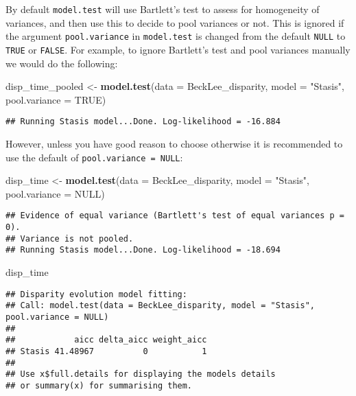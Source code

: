 \documentclass[
]{book}
\newenvironment{Shaded}{\begin{snugshade}}{\end{snugshade}}
\newcommand{\DataTypeTok}[1]{\textcolor[rgb]{0.13,0.29,0.53}{#1}}
\newcommand{\KeywordTok}[1]{\textcolor[rgb]{0.13,0.29,0.53}{\textbf{#1}}}
\newcommand{\NormalTok}[1]{#1}
\newcommand{\OtherTok}[1]{\textcolor[rgb]{0.56,0.35,0.01}{#1}}
\newcommand{\StringTok}[1]{\textcolor[rgb]{0.31,0.60,0.02}{#1}}
\begin{document}
By default \texttt{model.test} will use Bartlett's test to assess for homogeneity of variances, and then use this to decide to pool variances or not.
This is ignored if the argument \texttt{pool.variance} in \texttt{model.test} is changed from the default \texttt{NULL} to \texttt{TRUE} or \texttt{FALSE}.
For example, to ignore Bartlett's test and pool variances manually we would do the following:

\begin{Shaded}
\begin{Highlighting}[]
\NormalTok{disp\_time\_pooled \textless{}{-}}\StringTok{ }\KeywordTok{model.test}\NormalTok{(}\DataTypeTok{data =}\NormalTok{ BeckLee\_disparity,}
                               \DataTypeTok{model =} \StringTok{"Stasis"}\NormalTok{,}
                               \DataTypeTok{pool.variance =} \OtherTok{TRUE}\NormalTok{)}
\end{Highlighting}
\end{Shaded}

\begin{verbatim}
## Running Stasis model...Done. Log-likelihood = -16.884
\end{verbatim}

However, unless you have good reason to choose otherwise it is recommended to use the default of \texttt{pool.variance\ =\ NULL}:

\begin{Shaded}
\begin{Highlighting}[]
\NormalTok{disp\_time \textless{}{-}}\StringTok{ }\KeywordTok{model.test}\NormalTok{(}\DataTypeTok{data =}\NormalTok{ BeckLee\_disparity,}
                        \DataTypeTok{model =} \StringTok{"Stasis"}\NormalTok{,}
                        \DataTypeTok{pool.variance =} \OtherTok{NULL}\NormalTok{)}
\end{Highlighting}
\end{Shaded}

\begin{verbatim}
## Evidence of equal variance (Bartlett's test of equal variances p = 0).
## Variance is not pooled.
## Running Stasis model...Done. Log-likelihood = -18.694
\end{verbatim}

\begin{Shaded}
\begin{Highlighting}[]
\NormalTok{disp\_time}
\end{Highlighting}
\end{Shaded}

\begin{verbatim}
## Disparity evolution model fitting:
## Call: model.test(data = BeckLee_disparity, model = "Stasis", pool.variance = NULL) 
## 
##            aicc delta_aicc weight_aicc
## Stasis 41.48967          0           1
## 
## Use x$full.details for displaying the models details
## or summary(x) for summarising them.
\end{verbatim}
\end{document}
